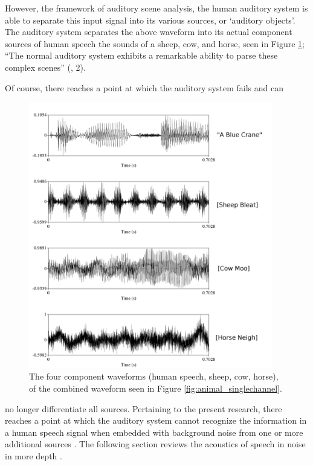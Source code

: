 However, \DIFdelbegin {}\DIFdelend \DIFaddbegin {}\DIFaddend the framework of auditory scene analysis, the human auditory system is able to separate this input signal into its various sources, or `auditory objects'.  The auditory system separates the above waveform into its actual component sources of human speech \DIFdelbegin {}\DIFdelend \DIFaddbegin {}\DIFaddend the sounds of a sheep, cow, and horse, seen in Figure \ref{fig:animal_multichannel}; ``The normal auditory system exhibits a remarkable ability to parse these complex scenes'' (\cite{middlebrooks:17}, 2).

Of course, there reaches a point at which the auditory system fails and can
%
\begin{figure}[h!]
\centering
  \includegraphics[width=0.95\textwidth]{figure/animal_multichannel-w-text.png}
  \caption{The four component waveforms (human speech, sheep, cow, horse), of the combined waveform seen in Figure \ref{fig:animal_singlechannel}.}
  \label{fig:animal_multichannel}
\end{figure}
%
no longer differentiate all sources. Pertaining to the present research, there reaches a point at which the auditory system cannot recognize the information in a human speech signal when embedded with background noise from one or more additional sources \DIFaddbegin {}\DIFaddend .  The following section reviews the acoustics of speech in noise in more depth .

